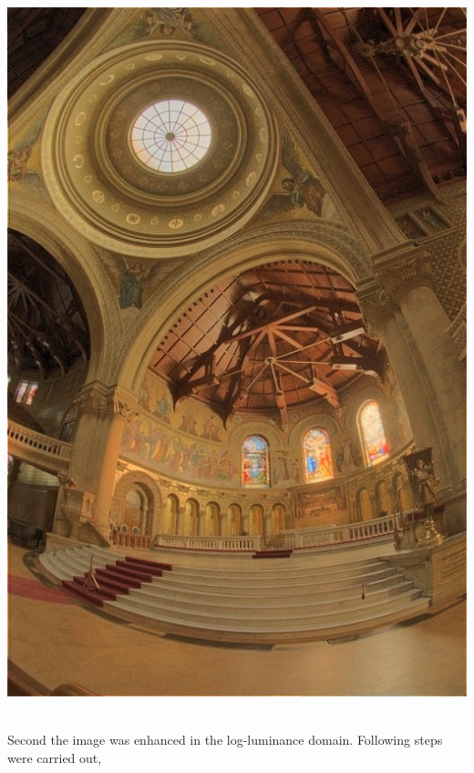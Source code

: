 \documentclass{article}
\begin{document}
\begin{itemize}
        \includegraphics[scale=.25]{./data/2/ln/s3.jpg}
    \end{itemize}
    \\
    Second the image was enhanced in the log-luminance domain. Following steps were carried out,
\end{document}
